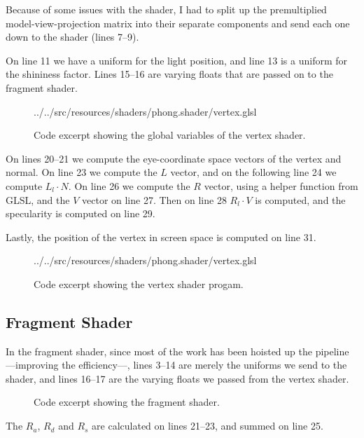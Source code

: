 \documentclass[11pt]{article}
\begin{document}
Because of some issues with the shader, I had to split up the premultiplied
model-view-projection matrix into their separate components and send each one
down to the shader (lines 7--9).

On line 11 we have a uniform for the light position, and line 13 is a uniform
for the shininess factor. Lines 15--16 are varying floats that are passed on
to the fragment shader.

\begin{figure}[H]
    
    {../../src/resources/shaders/phong.shader/vertex.glsl}
    \caption{Code excerpt showing the global variables of the vertex shader.}
    \label{code:vertex-shader-globals}
\end{figure}

On lines 20--21 we compute the eye-coordinate space vectors of the vertex and
normal. On line 23 we compute the $L$ vector, and on the following line 24 we
compute $L_l \cdot N$. On line 26 we compute the $R$ vector, using a helper
function from GLSL, and the $V$ vector on line 27. Then on line 28 $R_l \cdot
V$ is computed, and the specularity is computed on line 29.

Lastly, the position of the vertex in screen space is computed on line 31.

\begin{figure}[H]
    
    {../../src/resources/shaders/phong.shader/vertex.glsl}
    \caption{Code excerpt showing the vertex shader progam.}
    \label{code:vertex-shader}
\end{figure}

\subsection{Fragment Shader}
In the fragment shader, since most of the work has been hoisted up the
pipeline ---improving the efficiency---, lines 3--14 are merely the uniforms
we send to the shader, and lines 16--17 are the varying floats we passed from
the vertex shader.

\begin{figure}[H]
    
    \caption{Code excerpt showing the fragment shader.}
    \label{code:fragment-shader}
\end{figure}

The $R_a$, $R_d$ and $R_s$ are calculated on lines 21--23, and summed on line
25.
\end{document}
